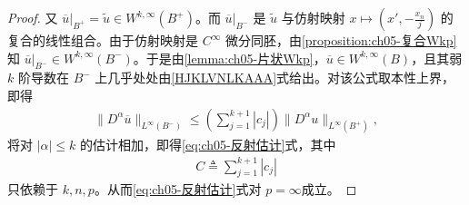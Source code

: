 \documentclass[../../main.tex]{subfiles}
\begin{document}
\begin{proof}
又 $\overline{u}|_{B^{+}}=\widetilde{u}\in W^{k,\infty}(B^{+})$。而 $\overline{u}|_{B^{-}}$ 是 $\widetilde{u}$ 与仿射映射 $x\mapsto\left(x',-\frac{x_n}{j}\right)$ 的复合的线性组合。由于仿射映射是 $C^{\infty}$ 微分同胚，由\cref{proposition:ch05-复合Wkp}知 $\overline{u}|_{B^{-}}\in W^{k,\infty}(B^{-})$。于是由\cref{lemma:ch05-片状Wkp}，$\overline{u}\in W^{k,\infty}(B)$，且其弱 $k$ 阶导数在 $B^{-}$ 上几乎处处由\eqref{HJKLVNLKAAA}式给出。对该公式取本性上界，即得
\begin{align*}
\|D^{\alpha}\overline{u}\|_{L^{\infty}(B^{-})}
\leqslant\left(\sum_{j=1}^{k+1}|c_j|\right)\|D^{\alpha}u\|_{L^{\infty}(B^{+})},
\end{align*}
将对 $|\alpha|\leqslant k$ 的估计相加，即得\eqref{eq:ch05-反射估计}式，其中
\begin{align*}
C\triangleq \sum_{j=1}^{k+1}|c_j|
\end{align*}
只依赖于 $k,n,p$。从而\eqref{eq:ch05-反射估计}式对 $p=\infty$成立。
\end{proof}
\end{document}
